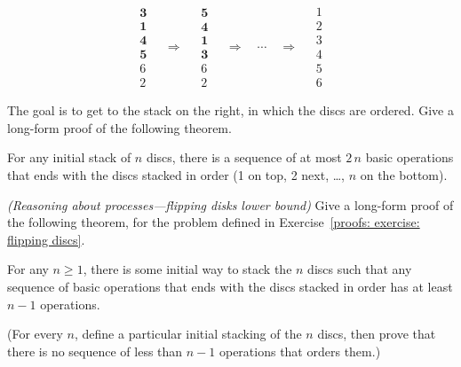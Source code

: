 \[\begin{array}{c}
    \mathbf 3 \\ \mathbf 1 \\ \mathbf 4 \\ \mathbf 5 \\ 6 \\ 2
  \end{array}
  \hspace{1em}  \Longrightarrow  \hspace{1em}
  \begin{array}{c}
    \mathbf 5 \\ \mathbf 4 \\ \mathbf 1 \\ \mathbf 3 \\ 6 \\ 2
  \end{array}
  \hspace{1em}  \Longrightarrow  \hspace{1em}  \cdots  \hspace{1em}  \Longrightarrow  \hspace{1em}
  \begin{array}{c}
     1 \\  2 \\  3 \\  4 \\ 5 \\ 6
  \end{array}
\]

The goal is to get to the stack on the right, in which the discs are ordered.
Give a long-form proof of the following theorem.
\begin{theorem}
  For any initial stack of $n$ discs,
  there is a sequence of at most $2\,n$ basic operations that ends with the discs stacked in order
  (1 on top, 2 next, \ldots, $n$ on the bottom).
\end{theorem}

\exercise \emph{(Reasoning about processes---flipping disks lower bound)}
Give a long-form proof of the following theorem,
for the problem defined in Exercise~\ref{proofs: exercise: flipping discs}.
\begin{theorem}
  For any $n\ge 1$, there is some initial way to stack the $n$ discs
  such that any sequence of basic operations that ends with the discs stacked in order
  has at least $n-1$ operations.
\end{theorem}
(For every $n$, define a particular initial stacking of the $n$ discs,
then prove that there is no sequence of less than $n-1$ operations that orders them.)

